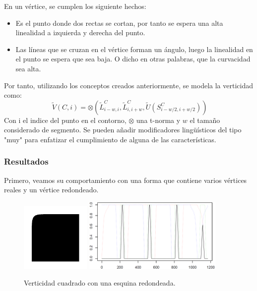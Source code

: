 En un vértice, se cumplen los siguiente hechos:
\begin{itemize}
\item Es el punto donde dos rectas se cortan, por tanto se espera una alta linealidad a izquierda y derecha del punto.
\item Las líneas que se cruzan en el vértice forman un ángulo, luego la linealidad en el punto se espera que sea baja. O dicho en otras palabras, que la curvacidad sea alta.
\end{itemize}

Por tanto, utilizando los conceptos creados anteriormente, se modela la verticidad como:\\

\[
\ \tilde{V}(C,i) = \otimes \left(\tilde{L}^C_{i-w,i}, \tilde{L}^C_{i,i+w},  \tilde{U}(S^C_{i-w/2,i+w/2})   \right)
\]
Con i el indice del punto en el contorno, $ \otimes $ una t-norma y $w$ el tamaño considerado de segmento. Se pueden añadir modificadores lingüísticos del tipo "muy" para enfatizar el cumplimiento de alguna de las características.

\subsubsection{Resultados}

Primero, veamos su comportamiento con una forma que contiene varios vértices reales y un vértice redondeado.\\

\begin{figure}[H]
\begin{center}

\includegraphics[width=0.3\textwidth]{img/fig4.png} \hfill \includegraphics[width=0.6\textwidth]{img/vert-fig04-novvery.png}
\end{center}

\caption{Verticidad cuadrado con una esquina redondeada.}
\label{fig11}
\end{figure}

